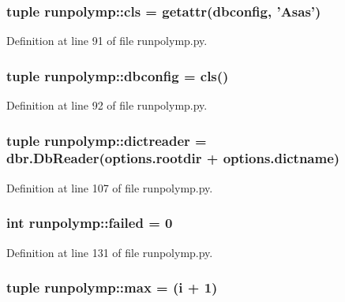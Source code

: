 \hypertarget{namespacerunpolymp_a792265f8b2a708d4ce5fdb59becb528a}{
\subsubsection[{cls}]{\setlength{\rightskip}{0pt plus 5cm}tuple {\bf runpolymp::cls} = getattr({\bf dbconfig}, 'Asas')}}
\label{namespacerunpolymp_a792265f8b2a708d4ce5fdb59becb528a}


Definition at line 91 of file runpolymp.py.

\hypertarget{namespacerunpolymp_af34401144c456e1951c68c99f91d5249}{
\subsubsection[{dbconfig}]{\setlength{\rightskip}{0pt plus 5cm}tuple {\bf runpolymp::dbconfig} = {\bf cls}()}}
\label{namespacerunpolymp_af34401144c456e1951c68c99f91d5249}


Definition at line 92 of file runpolymp.py.

\hypertarget{namespacerunpolymp_a59d220b1ff9a930fe2889535b8835d13}{
\subsubsection[{dictreader}]{\setlength{\rightskip}{0pt plus 5cm}tuple {\bf runpolymp::dictreader} = dbr.DbReader(options.rootdir + options.dictname)}}
\label{namespacerunpolymp_a59d220b1ff9a930fe2889535b8835d13}


Definition at line 107 of file runpolymp.py.

\hypertarget{namespacerunpolymp_a0c32d94825e8d3aa839ff639347ef697}{
\subsubsection[{failed}]{\setlength{\rightskip}{0pt plus 5cm}int {\bf runpolymp::failed} = 0}}
\label{namespacerunpolymp_a0c32d94825e8d3aa839ff639347ef697}


Definition at line 131 of file runpolymp.py.

\hypertarget{namespacerunpolymp_ae92e281387570c7fc239c7c639ac57d6}{
\subsubsection[{max}]{\setlength{\rightskip}{0pt plus 5cm}tuple {\bf runpolymp::max} = (i + 1)}}
\label{namespacerunpolymp_ae92e281387570c7fc239c7c639ac57d6}


